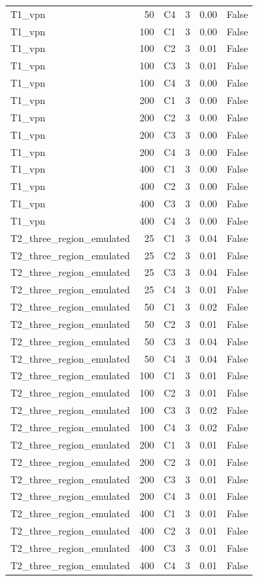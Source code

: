 \begin{table}[t]
\begin{tabular}{lrrrrr}
T1\_vpn & 50 & C4 & 3 & 0.00 & False \\
T1\_vpn & 100 & C1 & 3 & 0.00 & False \\
T1\_vpn & 100 & C2 & 3 & 0.01 & False \\
T1\_vpn & 100 & C3 & 3 & 0.01 & False \\
T1\_vpn & 100 & C4 & 3 & 0.00 & False \\
T1\_vpn & 200 & C1 & 3 & 0.00 & False \\
T1\_vpn & 200 & C2 & 3 & 0.00 & False \\
T1\_vpn & 200 & C3 & 3 & 0.00 & False \\
T1\_vpn & 200 & C4 & 3 & 0.00 & False \\
T1\_vpn & 400 & C1 & 3 & 0.00 & False \\
T1\_vpn & 400 & C2 & 3 & 0.00 & False \\
T1\_vpn & 400 & C3 & 3 & 0.00 & False \\
T1\_vpn & 400 & C4 & 3 & 0.00 & False \\
T2\_three\_region\_emulated & 25 & C1 & 3 & 0.04 & False \\
T2\_three\_region\_emulated & 25 & C2 & 3 & 0.01 & False \\
T2\_three\_region\_emulated & 25 & C3 & 3 & 0.04 & False \\
T2\_three\_region\_emulated & 25 & C4 & 3 & 0.01 & False \\
T2\_three\_region\_emulated & 50 & C1 & 3 & 0.02 & False \\
T2\_three\_region\_emulated & 50 & C2 & 3 & 0.01 & False \\
T2\_three\_region\_emulated & 50 & C3 & 3 & 0.04 & False \\
T2\_three\_region\_emulated & 50 & C4 & 3 & 0.04 & False \\
T2\_three\_region\_emulated & 100 & C1 & 3 & 0.01 & False \\
T2\_three\_region\_emulated & 100 & C2 & 3 & 0.01 & False \\
T2\_three\_region\_emulated & 100 & C3 & 3 & 0.02 & False \\
T2\_three\_region\_emulated & 100 & C4 & 3 & 0.02 & False \\
T2\_three\_region\_emulated & 200 & C1 & 3 & 0.01 & False \\
T2\_three\_region\_emulated & 200 & C2 & 3 & 0.01 & False \\
T2\_three\_region\_emulated & 200 & C3 & 3 & 0.01 & False \\
T2\_three\_region\_emulated & 200 & C4 & 3 & 0.01 & False \\
T2\_three\_region\_emulated & 400 & C1 & 3 & 0.01 & False \\
T2\_three\_region\_emulated & 400 & C2 & 3 & 0.01 & False \\
T2\_three\_region\_emulated & 400 & C3 & 3 & 0.01 & False \\
T2\_three\_region\_emulated & 400 & C4 & 3 & 0.01 & False \\
\hline
\end{tabular}
\end{table}
